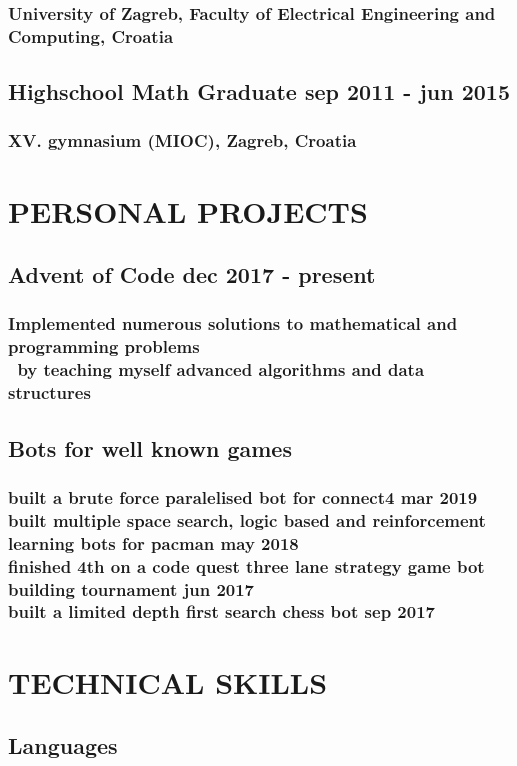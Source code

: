 \documentclass{article}
\begin{document}
\subsubsection{University of Zagreb, Faculty of Electrical Engineering and Computing, Croatia}
\subsection{Highschool Math Graduate \hfill sep 2011 - jun 2015}
\subsubsection{XV. gymnasium (MIOC), Zagreb, Croatia}

\section{PERSONAL PROJECTS} 
\subsection{Advent of Code \hfill dec 2017 - present}
\subsubsection{Implemented numerous solutions to mathematical and programming problems
	\\\-\ \quad by teaching myself advanced algorithms and data structures}
\subsection{Bots for well known games}
\subsubsection{built a brute force paralelised bot for connect4 \hfill mar 2019
	\\built multiple space search, logic based and reinforcement learning bots for pacman \hfill may 2018
	\\finished 4th on a code quest three lane strategy game bot building tournament \hfill jun 2017
	\\built a limited depth first search chess bot \hfill sep 2017}

\section{TECHNICAL SKILLS}
\subsection{Languages}
\end{document}

